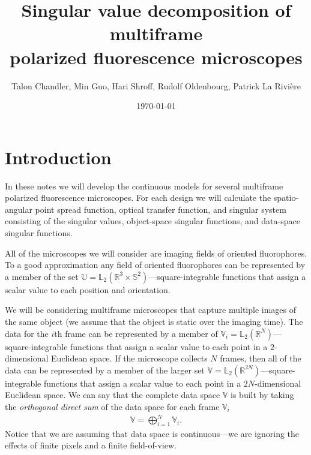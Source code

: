 \documentclass[11pt]{article}
\providecommand{\mbb}[1]{\mathbb{#1}}
\begin{document}
\title{\vspace{-2.5em} Singular value decomposition of multiframe\\ polarized
  fluorescence microscopes\vspace{-1em}} \author{Talon Chandler, Min Guo, Hari
  Shroff, Rudolf Oldenbourg, Patrick La Rivi\`ere}
\date{\vspace{-1em}\today\vspace{-1em}}
\maketitle
\section{Introduction}
In these notes we will develop the continuous models for several multiframe
polarized fluorescence microscopes. For each design we will calculate the
spatio-angular point spread function, optical transfer function, and singular
system consisting of the singular values, object-space singular functions, and
data-space singular functions.

All of the microscopes we will consider are imaging fields of oriented
fluorophores. To a good approximation any field of oriented fluorophores can be
represented by a member of the set
$\mbb{U} = \mbb{L}_2(\mbb{R}^3 \times \mbb{S}^2)$---square-integrable functions
that assign a scalar value to each position and orientation.

We will be considering multiframe microscopes that capture multiple images of
the same object (we assume that the object is static over the imaging time). The
data for the $i$th frame can be represented by a member of
$\mbb{V}_i = \mbb{L}_2(\mbb{R}^{N})$---square-integrable functions that assign a
scalar value to each point in a $2$-dimensional Euclidean space. If the
microscope collects $N$ frames, then all of the data can be represented by a
member of the larger set $\mbb{V} = \mbb{L}_2(\mbb{R}^{2N})$---square-integrable
functions that assign a scalar value to each point in a $2N$-dimensional
Euclidean space. We can say that the complete data space $\mbb{V}$ is built by
taking the \textit{orthogonal direct sum} of the data space for each frame
$\mbb{V}_i$
\begin{align}
  \mbb{V} = \bigoplus_{i=1}^N \mbb{V}_i.
\end{align}
Notice that we are assuming that data space is continuous---we
are ignoring the effects of finite pixels and a finite field-of-view.
\end{document}

